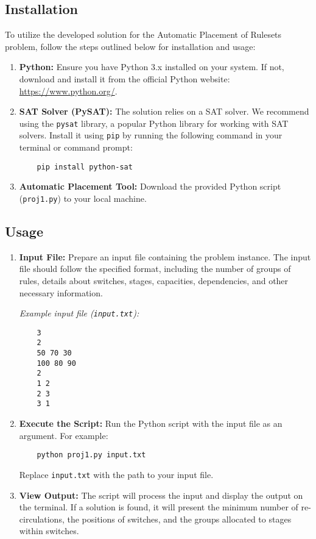 \subsection{Installation}

To utilize the developed solution for the Automatic Placement of Rulesets problem, follow the steps outlined below for installation and usage:

\begin{enumerate}
    \item \textbf{Python:} Ensure you have Python 3.x installed on your system. If not, download and install it from the official Python website: \url{https://www.python.org/}.

    \item \textbf{SAT Solver (PySAT):} The solution relies on a SAT solver. We recommend using the \texttt{pysat} library, a popular Python library for working with SAT solvers. Install it using \texttt{pip} by running the following command in your terminal or command prompt:

          \begin{verbatim}
    pip install python-sat
    \end{verbatim}

    \item \textbf{Automatic Placement Tool:} Download the provided Python script (\texttt{proj1.py}) to your local machine.
\end{enumerate}

\subsection{Usage}

\begin{enumerate}
    \item \textbf{Input File:} Prepare an input file containing the problem instance. The input file should follow the specified format, including the number of groups of rules, details about switches, stages, capacities, dependencies, and other necessary information.

          \textit{Example input file (\texttt{input.txt}):}
          \begin{verbatim}
    3
    2
    50 70 30
    100 80 90
    2
    1 2
    2 3
    3 1
    \end{verbatim}

    \item \textbf{Execute the Script:} Run the Python script with the input file as an argument. For example:

          \begin{verbatim}
    python proj1.py input.txt
    \end{verbatim}

          Replace \texttt{input.txt} with the path to your input file.

    \item \textbf{View Output:} The script will process the input and display the output on the terminal. If a solution is found, it will present the minimum number of re-circulations, the positions of switches, and the groups allocated to stages within switches.
\end{enumerate}

